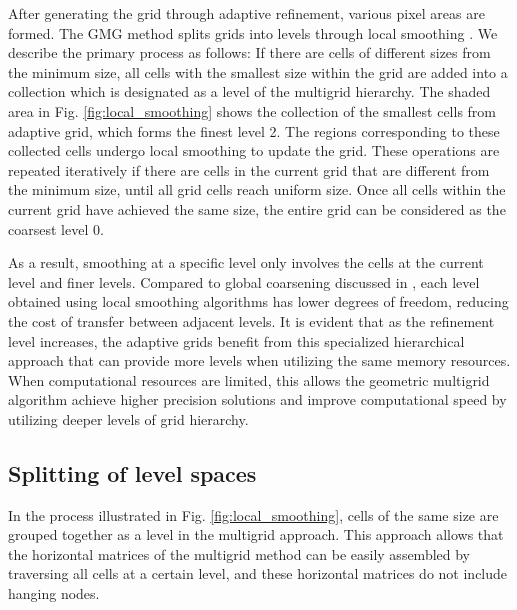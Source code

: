 \documentclass[extra, referee]{gji}
\begin{document}
After generating the grid through adaptive refinement, various pixel areas are
formed. The GMG method splits grids into levels through local smoothing
\citep{Munch2023,Bastian2006,Clevenger2021}. We describe the primary process as
follows: If there are cells of different sizes from the minimum size, all cells
with the smallest size within the grid are added into a collection which is
designated as a level of the multigrid hierarchy. The shaded area in Fig.
\ref{fig:local_smoothing} shows the collection of the smallest cells from adaptive grid,
which forms the finest level 2. The regions corresponding to these collected
cells undergo local smoothing to update the grid. These operations are repeated
iteratively if there are cells in the current grid that are different from the
minimum size, until all grid cells reach uniform size. Once all cells within the
current grid have achieved the same size, the entire grid can be considered as
the coarsest level 0.

As a result, smoothing at a specific level only involves the cells at the
current level and finer levels. Compared to global coarsening discussed in
\citep{Huang2023}, each level obtained using local smoothing algorithms has
lower degrees of freedom, reducing the cost of transfer between adjacent levels.
It is evident that as the refinement level increases, the adaptive grids benefit
from this specialized hierarchical approach that can provide more levels when
utilizing the same memory resources. When computational resources are limited,
this allows the geometric multigrid algorithm achieve higher precision solutions
and improve computational speed by utilizing deeper levels of grid hierarchy.

\subsection{Splitting of level spaces}

In the process illustrated in Fig. \ref{fig:local_smoothing},  cells of the same size are
grouped together as a level in the multigrid approach. This approach allows that
the horizontal matrices of the multigrid method can be easily assembled by
traversing all cells at a certain level, and these horizontal matrices do not
include hanging nodes.
\end{document}
